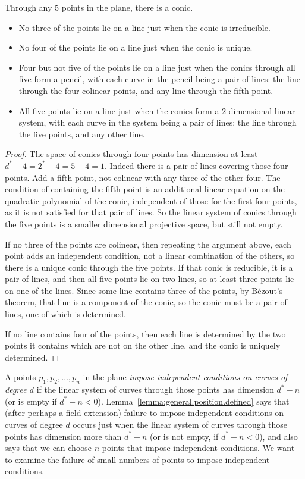 \begin{lemma}\label{lemma:conics.5.points}
Through any \(5\) points in the plane, there is a conic.
\begin{itemize}
\item
No three of the points lie on a line just when the conic is irreducible.
\item
No four of the points lie on a line just when the conic is unique.
\item
Four but not five of the points lie on a line just when the conics through all five form a pencil, with each curve in the pencil being a pair of lines: the line through the four colinear points, and any line through the fifth point.
\item
All five points lie on a line just when the conics form a \(2\)-dimensional linear system, with each curve in the system being a pair of lines: the line through the five points, and any other line.
\end{itemize}
\end{lemma}
\begin{proof}
The space of conics through four points has dimension at least \(d^*-4=2^*-4=5-4=1\).
Indeed there is a pair of lines covering those four points.
Add a fifth point, not colinear with any three of the other four.
The condition of containing the fifth point is an additional linear equation on the quadratic polynomial of the conic, independent of those for the first four points, as it is not satisfied for that pair of lines.
So the linear system of conics through the five points is a smaller dimensional projective space, but still not empty.

If no three of the points are colinear, then repeating the argument above, each point adds an independent condition, not a linear combination of the others, so there is a unique conic through the five points.
If that conic is reducible, it is a pair of lines, and then all five points lie on two lines, so at least three points lie on one of the lines.
Since some line contains three of the points, by B\'ezout's theorem, that line is a component of the conic, so the conic must be a pair of lines, one of which is determined.

If no line contains four of the points, then each line is determined by the two points it contains which are not on the other line, and the conic is uniquely determined.
\end{proof}


A points \(p_1,p_2,\dots,p_n\) in the plane \emph{impose independent conditions on curves of degree \(d\)} if the linear system of curves through those points has dimension \(d^*-n\) (or is empty if \(d^*-n<0\)).
Lemma~\vref{lemma:general.position.defined} says that (after perhaps a field extension) failure to impose independent conditions on curves of degree \(d\) occurs just when the linear system of curves through those points has dimension more than \(d^*-n\) (or is not empty, if \(d^*-n<0\)), and also says that we can choose \(n\) points that impose independent conditions.
We want to examine the failure of small numbers of points to impose independent conditions.

